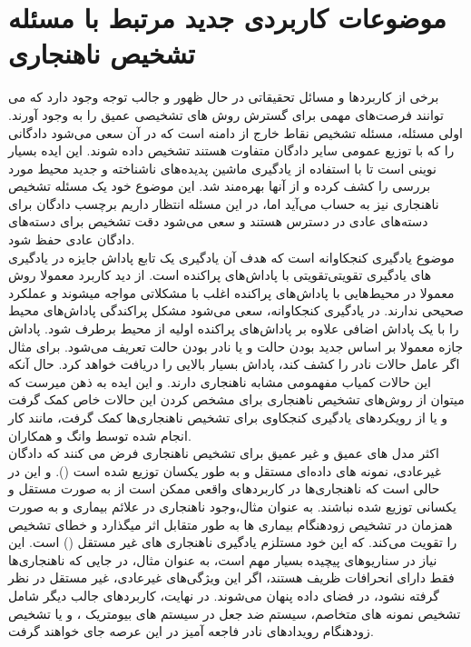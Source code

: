 \documentclass[12pt,a4paper]{report}
\theoremstyle{definition}
\theoremstyle{definition}
\begin{document}
\section{موضوعات کاربردی جدید مرتبط با مسئله تشخیص ناهنجاری}
برخی از کاربرد‌ها و مسائل تحقیقاتی در حال ظهور و جالب توجه وجود دارد که می توانند فرصت‌های مهمی برای گسترش روش های تشخیصی عمیق  را به وجود آورند. اولی مسئله، مسئله تشخیص نقاط خارج از دامنه است که در آن سعی می‌شود دادگانی را که با توزیع عمومی سایر دادگان متفاوت هستند تشخیص داده شوند\cite{https://doi.org/10.48550/arxiv.1610.02136, NEURIPS2018_abdeb6f5, https://doi.org/10.48550/arxiv.1906.02845}. این ایده بسیار نوینی است تا با استفاده از یادگیری ماشین پدیده‌های ناشناخته و جدید محیط مورد بررسی را کشف کرده و از آنها بهره‌مند شد. این موضوع خود یک مسئله تشخیص ناهنجاری نیز به حساب می‌آید اما، در این مسئله انتظار داریم برچسب دادگان برای دسته‌های عادی در دسترس هستند و سعی می‌شود دقت تشخیص برای دسته‌های دادگان عادی حفظ شود. \\

موضوع یادگیری کنجکاوانه است\cite{https://doi.org/10.48550/arxiv.1810.12894, https://doi.org/10.48550/arxiv.1808.04355, https://doi.org/10.48550/arxiv.1705.05363} که هدف آن یادگیری یک تابع پاداش جایزه در یادگیری تقویتی با پاداش‌های پراکنده است. از دید کاربرد معمولا روش‌‎های یادگیری تقویتی معمولا در محیط‌هایی با پاداش‌های پراکنده اغلب با مشکلاتی مواجه میشوند و عملکرد صحیحی ندارند. در یادگیری کنجکاوانه، سعی می‌شود مشکل پراکندگی پاداش‌های محیط را با یک پاداش اضافی علاوه بر پاداش‌های پراکنده اولیه از محیط برطرف شود. پاداش جازه معمولا بر اساس جدید بودن حالت و یا نادر بودن حالت تعریف می‌شود. برای مثال اگر عامل حالات نادر را کشف کند، پاداش بسیار بالایی را دریافت خواهد کرد. حال آنکه این حالات کمیاب مفهمومی مشابه ناهنجاری دارند. و این ایده به ذهن میرست که میتوان از روش‌های تشخیص ناهنجاری برای مشخص کردن این حالات خاص کمک گرفت و یا از رویکرد‌های یادگیری کنجکاوی برای تشخیص ناهنجاری‌ها کمک گرفت، مانند کار انجام شده توسط وانگ و همکاران\cite{ijcai2020p408}.\\

اکثر مدل های عمیق و غیر عمیق برای تشخیص ناهنجاری فرض می کنند که دادگان غیرعادی، نمونه های داده‌ای مستقل و به طور یکسان توزیع شده است (). و این در حالی است که ناهنجاری‌ها در کاربرد‌های واقعی ممکن است از به صورت مستقل و یکسانی توزیع شده نباشند. به عنوان مثال،وجود ناهنجاری در علائم بیماری و به صورت همزمان در تشخیص زودهنگام بیماری ها به طور متقابل اثر میگذارد و خطای تشخیص را تقویت می‌کند. که این خود مستلزم یادگیری ناهنجاری های غیر مستقل () است\cite{Pang2019NonIIDOD}. این نیاز در سناریوهای پیچیده بسیار مهم است، به عنوان مثال، در جایی که ناهنجاری‌ها فقط دارای انحرافات ظریف هستند،‌ اگر این ویژگی‌های غیرعادی، غیر مستقل در نظر گرفته نشود، در فضای داده پنهان می‌شوند. در نهایت، کاربردهای جالب دیگر شامل تشخیص نمونه های متخاصم\cite{https://doi.org/10.48550/arxiv.1702.06280, https://doi.org/10.48550/arxiv.1802.03041}، سیستم ضد جعل در سیستم های بیومتریک \cite{KittlerJosef2020ASEf, PrezCabo2019DeepAD}، و یا تشخیص زودهنگام رویدادهای نادر فاجعه آمیز در این عرصه جای خواهند گرفت.
\end{document}
